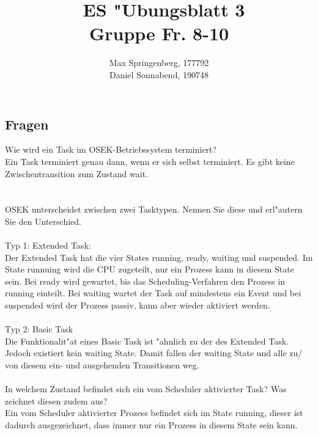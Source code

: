 \documentclass{article}
\author{Max Springenberg, 177792\\
        Daniel Sonnabend, 190748}
\title{\
    ES "Ubungsblatt 3\\
    Gruppe Fr. 8-10
    }
\date{}
\newcommand{\gap}{\ \\ \\}
\begin{document}
\maketitle
\newpage

\subsection{Fragen}

Wie wird ein Task im OSEK-Betriebssystem terminiert?\\
Ein Task terminiert genau dann, wenn er sich selbst terminiert. Es gibt keine
    Zwischentransition zum Zustand wait.\\
\gap
OSEK unterscheidet zwischen zwei Tasktypen. Nennen Sie diese und erl"autern Sie 
    den Unterschied.\\
\\
Typ 1: Extended Task:\\
Der Extended Task hat die vier States running, ready, waiting und suspended.
    Im State runnuing wird die CPU zugeteilt, nur ein Prozess kann in diesem
    State sein. Bei ready wird gewartet, bis das Scheduling-Verfahren den Prozess
    in running einteilt. Bei waiting wartet der Task auf mindestens ein Event 
    und bei suspended wird der Prozess passiv, kann aber wieder aktiviert werden.\\
\\
Typ 2: Basic Task\\
Die Funktionalit"at eines Basic Task ist "ahnlich zu der des Extended Task.
    Jedoch existiert kein waiting State. Damit fallen der waiting State und 
    alle zu/ von diesem ein- und ausgehenden Transitionen weg.
\gap
In welchem Zustand befindet sich ein vom Scheduler aktivierter Task? Was 
    zeichnet diesen zudem aus?\\
Ein vom Scheduler aktivierter Prozess befindet sich im State running, dieser
    ist dadurch ausgezeichnet, dass immer nur ein Prozess in diesem State sein
    kann.\\
\end{document}
